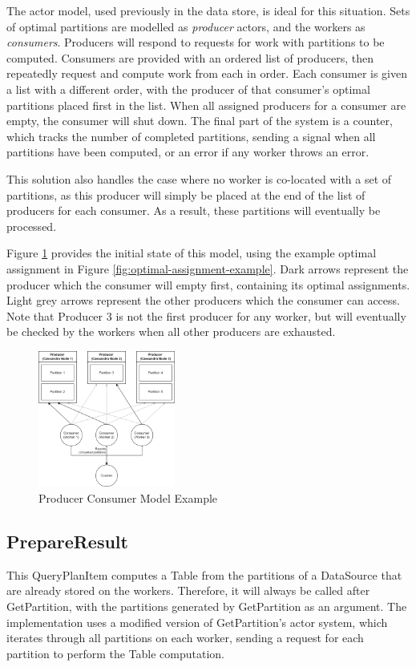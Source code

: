 The actor model, used previously in the data store, is ideal for this situation. Sets of optimal partitions are modelled as \textit{producer} actors, and the workers as \textit{consumers}. Producers will respond to requests for work with partitions to be computed. Consumers are provided with an ordered list of producers, then repeatedly request and compute work from each in order. Each consumer is given a list with a different order, with the producer of that consumer's optimal partitions placed first in the list. When all assigned producers for a consumer are empty, the consumer will shut down.  The final part of the system is a counter, which tracks the number of completed partitions, sending a signal when all partitions have been computed, or an error if any worker throws an error.

This solution also handles the case where no worker is co-located with a set of partitions, as this producer will simply be placed at the end of the list of producers for each consumer. As a result, these partitions will eventually be processed.

Figure \ref{fig:producer-consumer-model-example} provides the initial state of this model, using the example optimal assignment in Figure \ref{fig:optimal-assignment-example}. Dark arrows represent the producer which the consumer will empty first, containing its optimal assignments. Light grey arrows represent the other producers which the consumer can access. Note that Producer 3 is not the first producer for any worker, but will eventually be checked by the workers when all other producers are exhausted.

\begin{figure}[h]
	\centering
	\includegraphics[width=0.4\textwidth]{chapters/diagrams/implementation/producer-consumer-model-example}
	\caption{Producer Consumer Model Example}
	\label{fig:producer-consumer-model-example}
\end{figure}

\subsection{PrepareResult}
This QueryPlanItem computes a Table from the partitions of a DataSource that are already stored on the workers. Therefore, it will always be called after GetPartition, with the partitions generated by GetPartition as an argument. The implementation uses a modified version of GetPartition's actor system, which iterates through all partitions on each worker, sending a request for each partition to perform the Table computation.

